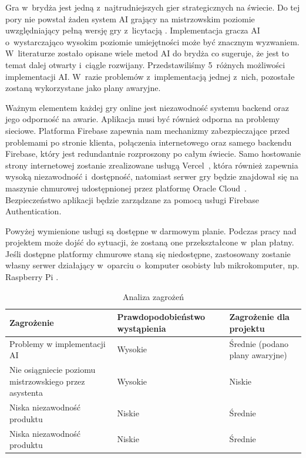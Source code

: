 Gra w~brydża jest jedną z~najtrudniejszych gier strategicznych na świecie.
Do tej pory nie powstał żaden system AI grający na mistrzowskim poziomie
uwzględniający pełną wersję gry z~licytacją \cite{Bethe2021AdvancesIC}.
Implementacja gracza AI o~wystarczająco wysokim poziomie umiejętności może
być znacznym wyzwaniem. W~literaturze zostało opisane wiele metod AI do brydża
\cite{Zhang2019DesignAD,Zhang2022TheSO,Zhang2022AIEB,Ginsberg1999GIBST}
co sugeruje, że jest to temat dalej otwarty i~ciągle rozwijany.
Przedstawiliśmy 5~różnych możliwości implementacji AI.
W~razie problemów z~implementacją jednej z~nich, pozostałe
zostaną wykorzystane jako plany awaryjne.

Ważnym elementem każdej gry online jest niezawodność systemu
backend oraz jego odporność na awarie.
Aplikacja musi być również odporna na problemy sieciowe.
Platforma Firebase zapewnia nam mechanizmy zabezpieczające
przed problemami po stronie klienta, połączenia internetowego
oraz samego backendu Firebase, który jest redundantnie
rozproszony po całym świecie.
Samo hostowanie strony internetowej zostanie zrealizowane
usługą Vercel~\cite{Vercel}, która również zapewnia wysoką
niezawodność i~dostępność, natomiast serwer gry będzie znajdował
się na maszynie chmurowej udostępnionej przez platformę Oracle Cloud~\cite{OracleCloud}.
Bezpieczeństwo aplikacji będzie zarządzane za pomocą
usługi Firebase Authentication.

Powyżej wymienione usługi są dostępne w darmowym planie.
Podczas pracy nad projektem może dojść do sytuacji, że
zostaną one przekształcone w~plan płatny.
Jeśli dostępne platformy chmurowe staną się niedostępne,
zastosowany zostanie własny serwer działający
w~oparciu o~komputer osobisty lub mikrokomputer, np. Raspberry Pi \cite{RPi}.

\begin{table}[h]
    \centering
    \begin{tabularx}{\textwidth}{|p{5.5cm}|Y|Y|}
        \hline
        \textbf{Zagrożenie}                                    & \textbf{Prawdopodobieństwo wystąpienia} & \textbf{Zagrożenie dla projektu} \tabularnewline[0.2cm]
        \hline
        Problemy w implementacji AI                            & Wysokie                                 & Średnie (podano plany awaryjne)  \tabularnewline[0.2cm]
        Nie osiągniecie poziomu mistrzowskiego przez asystenta & Wysokie                                 & Niskie                           \tabularnewline[0.3cm]
        Niska niezawodność produktu                            & Niskie                                  & Średnie                          \tabularnewline[0.1cm]
        Niska niezawodność produktu                            & Niskie                                  & Średnie                          \tabularnewline[0.1cm]
        \hline
    \end{tabularx}
    \caption{Analiza zagrożeń}
    \label{tab:zagrozenia}
\end{table}

